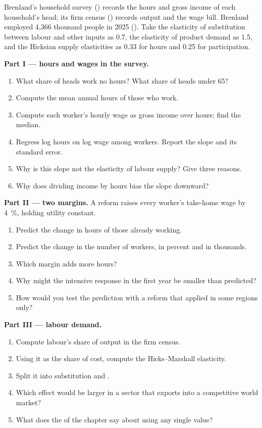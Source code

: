 \begin{problem}\label{pb:b3:labour-supply-and-demand:hours}
Brenland's household survey () records the hours and gross
income of each household's head; its firm census () records output
and the wage bill. Brenland employed 4{,}366 thousand people in 2025 ().
Take the elasticity of substitution between labour and other inputs as 0.7, the
elasticity of product demand as 1.5, and the Hicksian supply elasticities as 0.33 for
hours and 0.25 for participation. %

\medskip\noindent\textbf{Part I --- hours and wages in the survey.}
\begin{enumerate}
\item What share of heads work no hours? What share of heads under 65?
\item Compute the mean annual hours of those who work.
\item Compute each worker's hourly wage as gross income over hours; find the median.
\item Regress log hours on log wage among workers. Report the slope and its standard
error.
\item Why is this slope not the elasticity of labour supply? Give three reasons.
\item Why does dividing income by hours bias the slope downward?
\end{enumerate}

\medskip\noindent\textbf{Part II --- two margins.} A reform raises every worker's
take-home wage by 4~\%, holding utility constant.
\begin{enumerate}[resume]
\item Predict the change in hours of those already working.
\item Predict the change in the number of workers, in percent and in thousands.
\item Which margin adds more hours?
\item Why might the intensive response in the first year be smaller than predicted?
\item How would you test the prediction with a reform that applied in some regions
only?
\end{enumerate}

\medskip\noindent\textbf{Part III --- labour demand.}
\begin{enumerate}[resume]
\item Compute labour's share of output in the firm census.
\item Using it as the share of cost, compute the Hicks--Marshall elasticity.
\item Split it into substitution and .
\item Which effect would be larger in a sector that exports into a competitive world
market?
\item What does the  of the chapter say about using any single value?
\end{enumerate}


\end{problem}
